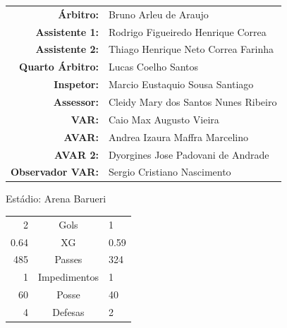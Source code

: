 \documentclass[11pt]{article}
\begin{document}
\vspace{0.5cm}
\begin{minipage}{0.65\textwidth}
\begin{center}
\begin{tabular}{rl}
\textbf{Árbitro:} & Bruno Arleu de Araujo \\
\textbf{Assistente 1:} & Rodrigo Figueiredo Henrique Correa \\
\textbf{Assistente 2:} & Thiago Henrique Neto Correa Farinha \\
\textbf{Quarto Árbitro:} & Lucas Coelho Santos \\
\textbf{Inspetor:} & Marcio Eustaquio Sousa Santiago \\
\textbf{Assessor:} & Cleidy Mary dos Santos Nunes Ribeiro \\
\textbf{VAR:} & Caio Max Augusto Vieira \\
\textbf{AVAR:} & Andrea Izaura Maffra Marcelino \\
\textbf{AVAR 2:} & Dyorgines Jose Padovani de Andrade \\
\textbf{Observador VAR:} & Sergio Cristiano Nascimento \\
\end{tabular}
\end{center}
\end{minipage}
\begin{minipage}{0.3\textwidth}
Estádio: Arena Barueri\\
\begin{tabular}{rcl}
2 & Gols & 1 \\
0.64 & XG & 0.59 \\
485 & Passes & 324 \\
1 & Impedimentos & 1 \\
60 & Posse & 40 \\
4 & Defesas & 2 \\
\end{tabular}
\end{minipage}
\newpage
\end{document}
